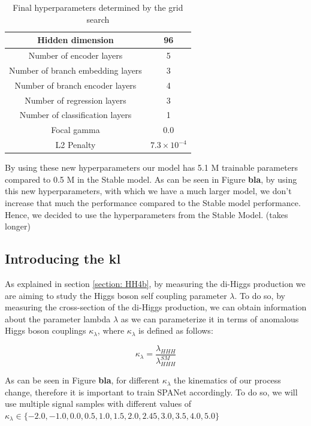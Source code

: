 \begin{table}[hbt]
\centering
\begin{tabular}{|c|c|}
 \hline
 Hidden dimension  &  96  \\
 \hline
Number of encoder layers & 5 \\
 \hline
 Number of branch embedding layers &  3\\
 \hline
  Number of branch encoder layers & 4\\
 \hline
 Number of regression layers & 3 \\
 \hline
 Number of classification layers & 1 \\
 \hline
 Focal gamma & 0.0 \\
 \hline
 L2 Penalty & $7.3\times 10^{-4}$ \\
 \hline
\end{tabular}
\caption{Final hyperparameters determined by the grid search}
\label{table: grid search}
\end{table}

By using these new hyperparameters our model has 5.1 M trainable parameters compared to 0.5 M in the Stable model. 
As can be seen in Figure \textbf{bla}, by using this new hyperparameters, with which we have a much larger model, 
we don't increase that much the performance compared to the Stable model performance. 
Hence, we decided to use the hyperparameters from the Stable Model. (takes longer)


\newpage

\subsection{Introducing the kl}

As explained in section \ref{section: HH4b}, by measuring the di-Higgs production we are aiming to study 
the Higgs boson self coupling parameter $\lambda$. To do so, by measuring the cross-section of the di-Higgs production, 
we can obtain information about the parameter lambda $\lambda$ as we can parameterize it in terms of anomalous Higgs
boson couplings $\kappa_\lambda$, where $\kappa_\lambda$ is defined as follows:

\begin{equation}
    \kappa_\lambda=\frac{\lambda_{HHH}}{\lambda^{SM}_{HHH}}
\end{equation}

As can be seen in Figure \textbf{bla}, for different $\kappa_\lambda$ the kinematics 
of our process change, therefore it is important to train SPANet accordingly. 
To do so, we will use multiple signal samples with different values of $\kappa_\lambda 
\in \{-2.0, -1.0, 0.0, 0.5, 1.0, 1.5, 2.0, 2.45, 3.0, 3.5, 4.0, 5.0\}$

